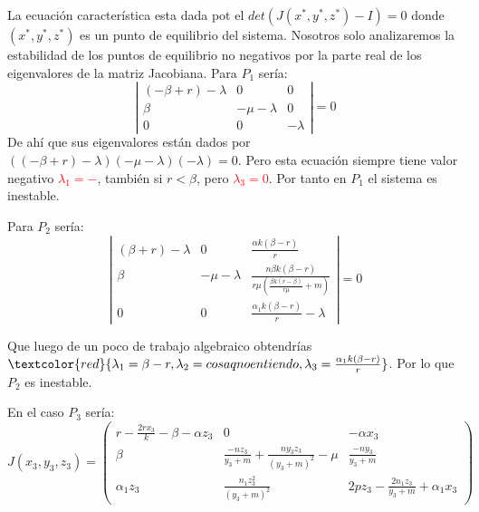 \documentclass{wscpaperproc}
\theoremstyle{wsc}
\begin{document}
La ecuación característica esta dada pot el $det(J(x^*, y^*, z^*)-I)=0$ donde $(x^*, y^*, z^*)$ es un punto de equilibrio del sistema.
Nosotros solo analizaremos la estabilidad de los puntos de equilibrio no negativos por la parte real de los eigenvalores de la matriz Jacobiana.
\vspace*{0.5cm}
Para $P_1$ sería:
$$\left|
	\begin{array}{ccc}
		(-\beta+r)-\lambda & 0            & 0        \\
		\beta              & -\mu-\lambda & 0        \\
		0                  & 0            & -\lambda
	\end{array}
	\right| =0$$
De ahí que sus eigenvalores están dados por $((-\beta+r)-\lambda)(-\mu-\lambda)(-\lambda)=0$. Pero esta ecuación siempre tiene valor negativo
\textcolor{red}{$\lambda_1=-$}, también si $r<\beta$, pero \textcolor{red}{$\lambda_3=0$}. Por tanto en $P_1$ el sistema es inestable.

\vspace*{0.5cm}

Para $P_2$ sería:
$$\left|
	\begin{array}{ccc}
		(\beta+r)-\lambda & 0            & \frac{\alpha k(\beta-r)}{r}                                      \\
		\beta             & -\mu-\lambda & \frac{n\beta k(\beta-r)}{r\mu (\frac{\beta k(r-\beta)}{r\mu}+m)} \\
		0                 & 0            & \frac{\alpha_1 k(\beta-r)}{r}-\lambda
	\end{array}
	\right| =0$$

Que luego de un poco de trabajo algebraico obtendrías $\textcolor{red}{\lambda_1=\beta-r, \lambda_2=cosa q no entiendo, \lambda_3=\frac{\alpha_1 k(\beta-r)}{r}}$. Por lo que $P_2$ es inestable.

\vspace*{0.5cm}

En el caso $P_3$ sería:
$$ J(x_3, y_3, z_3) = \left(
	\begin{array}{ccc}
			r-\frac{2rx_3}{k}-\beta-\alpha z_3 & 0                                                 & -\alpha x_3                             \\
			\beta                              & \frac{-nz_3}{y_3+m}+\frac{ny_3z_3}{(y_3+m)^2}-\mu & \frac{-ny_3}{y_3+m}                     \\
			\alpha_1z_3                        & \frac{n_1z_3^2}{(y_3+m)^2}                        & 2pz_3-\frac{2n_1z_3}{y_3+m}+\alpha_1x_3
		\end{array}
	\right)$$
\end{document}
